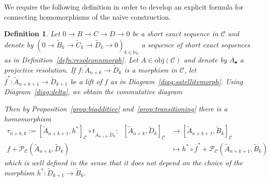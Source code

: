 \documentclass[12pt,a4paper]{article}
\numberwithin{equation}{section}
\newtheorem{defn}[thm]{Definition}
\theoremstyle{nonumberplain}
\begin{document}
We require the following definition in order to develop an explicit formula for connecting homomorphisms of the naïve construction.

\begin{defn}\label{defn:naiveconnmorph}
Let $0 \rightarrow B \rightarrow C \rightarrow D \rightarrow 0$ be a short exact sequence in $\mathcal{C}$ and denote by $(0 \rightarrow \widetilde{B}_k \rightarrow \widetilde{C}_k \rightarrow \widetilde{D}_k \rightarrow 0)_{k \in \mathbb{N}_0}$ a sequence of short exact sequences as in Definition~\ref{defn:resolconnmorph}. Let $A \in \mathrm{obj}(\mathcal{C})$ and denote by $A_{\bullet}$ a projective resolution. If $f: \widetilde{A}_{n+k} \rightarrow \widetilde{D}_k$ is a morphism in $\mathcal{C}$, let $\overline{f}^{\ast}: \widetilde{A}_{n+k+1} \rightarrow \widetilde{D}_{k+1}$ be a lift of $f$ as in Diagram~\ref{diag:satellitemorph}. Using Diagram~\ref{diag:delta}, we obtain the commutative diagram
\begin{center}
\end{center}
Then by Proposition~\ref{prop:biadditive} and~\ref{prop:transitioning} there is a homomorphism
\begin{align*}
\tau_{n+k, k} := [\widetilde{A}_{n+k+1}, h^{\ast}]_{\mathcal{C}} \circ t_{\widetilde{A}_{n+k}, \widetilde{D}_k}: \; \; [\widetilde{A}_{n+k}, \widetilde{D}_k]_{\mathcal{C}} &\rightarrow [\widetilde{A}_{n+k+1}, \widetilde{B}_k]_{\mathcal{C}} \\
f + \mathcal{P}_{\mathcal{C}}(\widetilde{A}_{n+k}, \widetilde{D}_k) &\mapsto h^{\ast} \circ \overline{f}^{\ast} + \mathcal{P}_{\mathcal{C}}(\widetilde{A}_{n+k+1}, \widetilde{B}_k)
\end{align*}
which is well defined in the sense that it does not depend on the choice of the morphism $h^{\ast}: \widetilde{D}_{k+1} \rightarrow \widetilde{B}_k$.
\end{defn}
\end{document}
